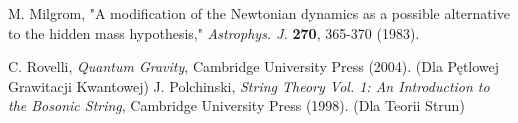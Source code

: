\documentclass[11pt,a4paper]{article}
\begin{document}
\begin{thebibliography}{99}
 M. Milgrom, "A modification of the Newtonian dynamics as a possible alternative to the hidden mass hypothesis," \textit{Astrophys. J.} \textbf{270}, 365-370 (1983).

 C. Rovelli, \textit{Quantum Gravity}, Cambridge University Press (2004). (Dla Pętlowej Grawitacji Kwantowej)
 J. Polchinski, \textit{String Theory Vol. 1: An Introduction to the Bosonic String}, Cambridge University Press (1998). (Dla Teorii Strun)

\end{thebibliography}
\end{document}
